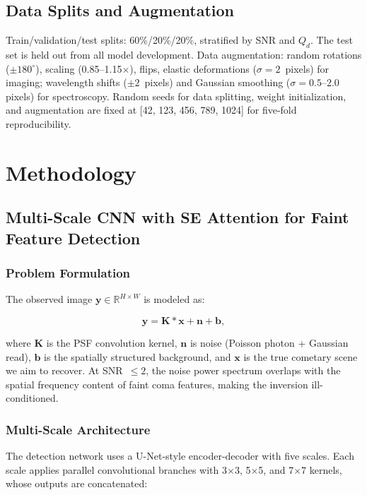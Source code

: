 \documentclass[usenatbib]{mnras}
\begin{document}
\subsection{Data Splits and Augmentation}

Train/validation/test splits: 60\%/20\%/20\%, stratified by SNR and $Q_d$. The test set is held out from all model development. Data augmentation: random rotations ($\pm 180^\circ$), scaling (0.85--1.15$\times$), flips, elastic deformations ($\sigma = 2$~pixels) for imaging; wavelength shifts ($\pm 2$~pixels) and Gaussian smoothing ($\sigma = 0.5$--2.0 pixels) for spectroscopy. Random seeds for data splitting, weight initialization, and augmentation are fixed at [42, 123, 456, 789, 1024] for five-fold reproducibility.

\section{Methodology}\label{sec:methods}

\subsection{Multi-Scale CNN with SE Attention for Faint Feature Detection}

\subsubsection{Problem Formulation}

The observed image $\mathbf{y} \in \mathbb{R}^{H \times W}$ is modeled as:

\begin{equation}\label{eq:forward_model}
\mathbf{y} = \mathbf{K} * \mathbf{x} + \mathbf{n} + \mathbf{b},
\end{equation}

where $\mathbf{K}$ is the PSF convolution kernel, $\mathbf{n}$ is noise (Poisson photon + Gaussian read), $\mathbf{b}$ is the spatially structured background, and $\mathbf{x}$ is the true cometary scene we aim to recover. At SNR~$\leq 2$, the noise power spectrum overlaps with the spatial frequency content of faint coma features, making the inversion ill-conditioned.

\subsubsection{Multi-Scale Architecture}

The detection network uses a U-Net-style encoder-decoder \citep{ronneberger15} with five scales. Each scale applies parallel convolutional branches with 3$\times$3, 5$\times$5, and 7$\times$7 kernels, whose outputs are concatenated:
\end{document}
